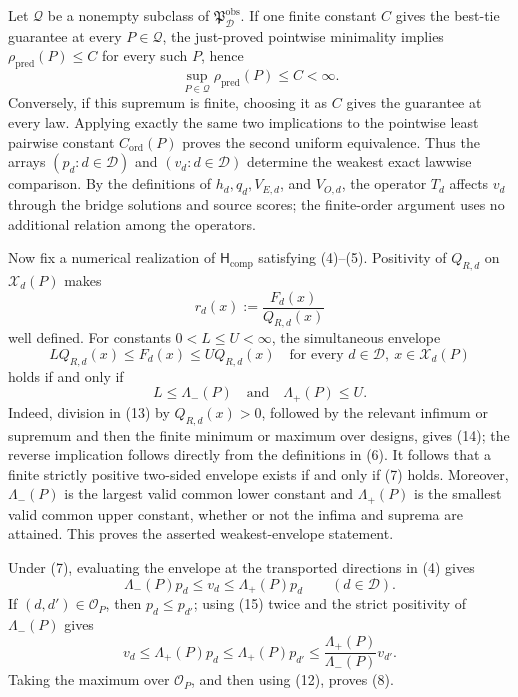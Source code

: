 Let \(\mathcal Q\) be a nonempty subclass of \(\mathfrak P_{\mathcal D}^{\mathrm{obs}}\).  If one finite constant \(C\) gives the best-tie guarantee at every \(P\in\mathcal Q\), the just-proved pointwise minimality implies \(\rho_{\mathrm{pred}}(P)\le C\) for every such \(P\), hence
\[
  \sup_{P\in\mathcal Q}\rho_{\mathrm{pred}}(P)\le C<\infty.
\]
Conversely, if this supremum is finite, choosing it as \(C\) gives the guarantee at every law.  Applying exactly the same two implications to the pointwise least pairwise constant \(C_{\mathrm{ord}}(P)\) proves the second uniform equivalence.  Thus the arrays \((p_d:d\in\mathcal D)\) and \((v_d:d\in\mathcal D)\) determine the weakest exact lawwise comparison.  By the definitions of \(h_d,q_d,V_{E,d}\), and \(V_{O,d}\), the operator \(T_d\) affects \(v_d\) through the bridge solutions and source scores; the finite-order argument uses no additional relation among the operators.

Now fix a numerical realization of \(\mathsf H_{\mathrm{comp}}\) satisfying (4)--(5).  Positivity of \(Q_{R,d}\) on \(\mathcal X_d(P)\) makes
\[
  r_d(x):=\frac{F_d(x)}{Q_{R,d}(x)}
\]
well defined.  For constants \(0<L\le U<\infty\), the simultaneous envelope
\[
  LQ_{R,d}(x)\le F_d(x)\le UQ_{R,d}(x)
  \quad\text{for every }d\in\mathcal D,
  \ x\in\mathcal X_d(P)                                    \tag{13}
\]
holds if and only if
\[
  L\le\Lambda_-(P)
  \quad\text{and}\quad
  \Lambda_+(P)\le U.                                       \tag{14}
\]
Indeed, division in (13) by \(Q_{R,d}(x)>0\), followed by the relevant infimum or supremum and then the finite minimum or maximum over designs, gives (14); the reverse implication follows directly from the definitions in (6).  It follows that a finite strictly positive two-sided envelope exists if and only if (7) holds.  Moreover, \(\Lambda_-(P)\) is the largest valid common lower constant and \(\Lambda_+(P)\) is the smallest valid common upper constant, whether or not the infima and suprema are attained.  This proves the asserted weakest-envelope statement.

Under (7), evaluating the envelope at the transported directions in (4) gives
\[
  \Lambda_-(P)p_d\le v_d\le\Lambda_+(P)p_d
  \qquad(d\in\mathcal D).                                  \tag{15}
\]
If \((d,d')\in\mathcal O_P\), then \(p_d\le p_{d'}\); using (15) twice and the strict positivity of \(\Lambda_-(P)\) gives
\[
  v_d\le\Lambda_+(P)p_d
      \le\Lambda_+(P)p_{d'}
      \le\frac{\Lambda_+(P)}{\Lambda_-(P)}v_{d'}.
\]
Taking the maximum over \(\mathcal O_P\), and then using (12), proves (8).

